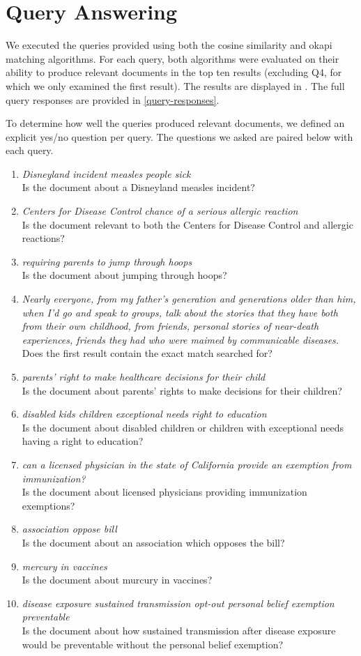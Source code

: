 \documentclass{report}
\newcommand{\query}[2]{\item\textit{#1}\\#2}
\newcommand{\okapi}{okapi }
\newcommand{\cosine}{cosine similarity }
\begin{document}
\section{Query Answering}
We executed the queries provided using both the \cosine and \okapi
matching algorithms. For each query, both algorithms were evaluated on
their ability to produce relevant documents in the top ten results
(excluding Q4, for which we only examined the first result). The
results are displayed in . The full query
responses are provided in \vref{query-responses}.

To determine how well the queries produced relevant documents, we
defined an explicit yes/no question per query. The questions we asked
are paired below with each query.

\begin{enumerate}[Q1:]
  \query{Disneyland incident measles people sick}{Is the document
about a Disneyland measles incident?}

  \query{Centers for Disease Control chance of a serious allergic
reaction}{Is the document relevant to both the Centers for Disease
Control and allergic reactions?}

  \query{requiring parents to jump through hoops}{Is the document
about jumping through hoops?}

  \query{Nearly everyone, from my father's generation and generations
older than him, when I'd go and speak to groups, talk about the
stories that they have both from their own childhood, from friends,
personal stories of near-death experiences, friends they had who were
maimed by communicable diseases.}{Does the first result contain the
exact match searched for?}

  \query{parents' right to make healthcare decisions for their
child}{Is the document about parents' rights to make decisions for
their children?}

  \query{disabled kids children exceptional needs right to
education}{Is the document about disabled children or children with
exceptional needs having a right to education?}

  \query{can a licensed physician in the state of California provide
an exemption from immunization?}{Is the document about licensed
physicians providing immunization exemptions?}

  \query{association oppose bill}{Is the document about an association
which opposes the bill?}

  \query{mercury in vaccines}{Is the document about murcury in
vaccines?}

  \query{disease exposure sustained transmission opt-out personal
belief exemption preventable}{Is the document about how sustained transmission after disease exposure would be preventable without the personal belief exemption?}
\end{enumerate}
\end{document}
